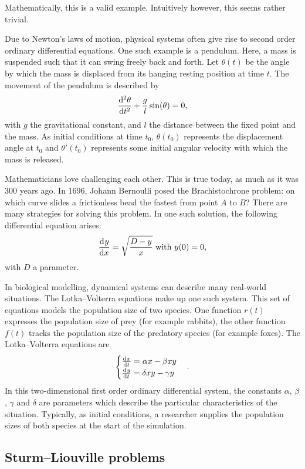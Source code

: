 Mathematically, this is a valid example. Intuitively however, this seems rather trivial.

Due to Newton's laws of motion, physical systems often give rise to second order ordinary differential equations. One such example is a pendulum. Here, a mass is suspended such that it can swing freely back and forth. Let $\theta(t)$ be the angle by which the mass is displaced from its hanging resting position at time $t$. The movement of the pendulum is described by
$$
    \dv[2]{\theta}{t} + \frac{g}{l} \sin(\theta) = 0\text{,}
$$
with $g$ the gravitational constant, and $l$ the distance between the fixed point and the mass. As initial conditions at time $t_0$, $\theta(t_0)$ represents the displacement angle at $t_0$ and $\theta'(t_0)$ represents some initial angular velocity with which the mass is released.

Mathematicians love challenging each other. This is true today, as much as it was 300 years ago. In 1696, Johann Bernoulli posed the Brachistochrone problem: on which curve slides a frictionless bead the fastest from point $A$ to $B$? There are many strategies for solving this problem. In one such solution, the following differential equation arises:
$$
    {\dv[]{y}{x}} = \sqrt{\frac{D - y}{x}} \text{ with $y(0) = 0$,}
$$
with $D$ a parameter.

In biological modelling, dynamical systems can describe many real-world situations. The Lotka--Volterra equations make up one such system. This set of equations models the population size of two species. One function $r(t)$ expresses the population size of prey (for example rabbits), the other function $f(t)$ tracks the population size of the predatory species (for example foxes). The Lotka--Volterra equations are
$$
    \begin{cases}
        \dv[]{x}{t} = \alpha x - \beta x y  \\
        \dv[]{y}{t} = \delta x y - \gamma y \\
    \end{cases}\text{.}
$$
In this two-dimensional first order ordinary differential system, the constants $\alpha$, $\beta$, $\gamma$ and $\delta$ are parameters which describe the particular characteristics of the situation. Typically, as initial conditions, a researcher supplies the population sizes of both species at the start of the simulation.

\subsection{Sturm--Liouville problems}

